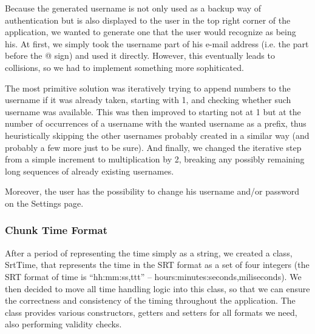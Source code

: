 Because the generated username is not only used as a backup way of authentication but is also displayed to the user in the top right corner of the application, we wanted to generate one that the user would recognize as being his. At first, we simply took the username part of his e-mail address (i.e. the part before the @ sign) and used it directly. However, this eventually leads to collisions, so we had to implement something more sophiticated.

The most primitive solution was iteratively trying to append numbers to the username if it was already taken, starting with 1, and checking whether such username was available. This was then improved to starting not at 1 but at the number of occurrences of a username with the wanted username as a prefix, thus heuristically skipping the other usernames probably created in a similar way (and probably a few more just to be sure). And finally, we changed the iterative step from a simple increment to multiplication by 2, breaking any possibly remaining long sequences of already existing usernames.

Moreover, the user has the possibility to change his username and/or password on the Settings page.


\subsubsection{Chunk Time Format}


% 

After a period of representing the time simply as a string, we created a class, SrtTime, that represents the time in the SRT format as a set of four integers (the SRT format of time is ``hh:mm:ss,ttt'' -- hours:minutes:seconds,miliseconds).
We then decided to move all time handling logic into this class, so that we can ensure the correctness and consistency of the timing throughout the application.
The class provides various constructors, getters and setters for all formats we need, also performing validity checks.

